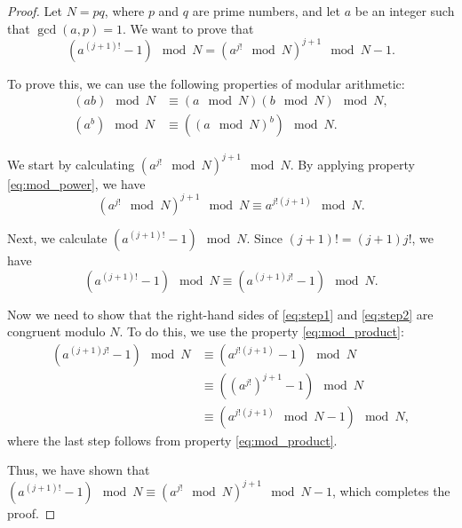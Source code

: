 \documentclass[12pt,openany]{book}
\theoremstyle{definition}
\begin{document}
	\begin{proof}
		Let $N = pq$, where $p$ and $q$ are prime numbers, and let $a$ be an integer such that $\gcd(a, p) = 1$. We want to prove that
		\begin{equation} \label{eq:congruence}
			(a^{(j+1)!} - 1) \mod N = (a^{j!} \mod N)^{j+1} \mod N - 1.
		\end{equation}
		
		To prove this, we can use the following properties of modular arithmetic:
		\begin{align}
			(ab) \mod N &\equiv (a \mod N)(b \mod N) \mod N, \label{eq:mod_product} \\
			(a^b) \mod N &\equiv ((a \mod N)^b) \mod N. \label{eq:mod_power}
		\end{align}
		
		We start by calculating $(a^{j!} \mod N)^{j+1} \mod N$. By applying property \eqref{eq:mod_power}, we have
		\begin{equation} \label{eq:step1}
			(a^{j!} \mod N)^{j+1} \mod N \equiv a^{j!(j+1)} \mod N.
		\end{equation}
		
		Next, we calculate $(a^{(j+1)!} - 1) \mod N$. Since $(j+1)! = (j+1)j!$, we have
		\begin{equation} \label{eq:step2}
			(a^{(j+1)!} - 1) \mod N \equiv (a^{(j+1)j!} - 1) \mod N.
		\end{equation}
		
		Now we need to show that the right-hand sides of \eqref{eq:step1} and \eqref{eq:step2} are congruent modulo $N$. To do this, we use the property \eqref{eq:mod_product}:
		\begin{align*}
			(a^{(j+1)j!} - 1) \mod N &\equiv (a^{j!(j+1)} - 1) \mod N \\
			&\equiv ((a^{j!})^{j+1} - 1) \mod N \\
			&\equiv (a^{j!(j+1)} \mod N - 1) \mod N,
		\end{align*}
		where the last step follows from property \eqref{eq:mod_product}.
		
		Thus, we have shown that $(a^{(j+1)!} - 1) \mod N \equiv (a^{j!} \mod N)^{j+1} \mod N - 1$, which completes the proof.
	\end{proof}
	
\end{document}
